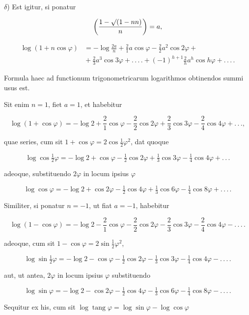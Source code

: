 $\delta$) Est igitur, si ponatur

\[
\left(\frac{1-\mathord{\surd}(1-nn)}{n}\right) = a,
\]

\[
\begin{aligned}
\log(1+n\cos\varphi) & = -\log\frac{2a}{n} + \frac{2}{1}a\cos\varphi - \frac{2}{2}a^2\cos2\varphi +\\
&{} + \frac{2}{3}a^3\cos3\varphi + .\,.\,.\,. + (-1)^{h+1}\frac{2}{h}a^h\cos h\varphi + .\,.\,.\,.
\end{aligned}
\]

 Formula haec ad functionum trigonometricarum logarithmos obtinendos summi
usus est.

Sit enim $n=1$, fiet $a=1$, et habebitur

\[
\log(1+\cos\varphi) = -\log 2 + \frac{2}{1}\cos\varphi - \frac{2}{2}\cos2\varphi + \frac{2}{3}\cos3\varphi - \frac{2}{4}\cos4\varphi + .\,.\,.,
\]

\noindent quae series, cum sit $1+\cos\varphi = 2\cos\frac{1}{2}\varphi^2$, 
dat quoque

\[
\log\cos\tfrac{1}{2}\varphi = -\log 2 + \cos\varphi - \tfrac{1}{2}\cos2\varphi + \tfrac{1}{3}\cos3\varphi - \tfrac{1}{4}\cos4\varphi + .\,.\,.
\]

\noindent adeoque, substituendo $2\varphi$ in locum ipsius $\varphi$

\[
\log\cos\varphi = -\log 2 + \cos2\varphi - \tfrac{1}{2}\cos4\varphi + \tfrac{1}{3}\cos6\varphi - \tfrac{1}{4}\cos8\varphi + .\,.\,.\,.
\]

\noindent Similiter, si ponatur $n=-1$, ut fiat $a=-1$, habebitur

\[
\log(1-\cos\varphi) = -\log 2 - \frac{2}{1}\cos\varphi - \frac{2}{2}\cos2\varphi - \frac{2}{3}\cos3\varphi - \frac{2}{4}\cos4\varphi - .\,.\,.\,.
\]

\noindent adeoque, cum sit $1-\cos\varphi = 2\sin\tfrac{1}{2}\varphi^2$, 

\[
\log\sin\tfrac{1}{2}\varphi = -\log 2 - \cos\varphi - \tfrac{1}{2}\cos2\varphi - \tfrac{1}{3}\cos3\varphi - \tfrac{1}{4}\cos4\varphi - .\,.\,.\,.
\]

\noindent aut, ut antea, $2\varphi$ in locum ipsius $\varphi$ substituendo

\[
\log\sin\varphi = -\log 2 - \cos2\varphi - \tfrac{1}{2}\cos4\varphi - \tfrac{1}{3}\cos6\varphi - \tfrac{1}{4}\cos8\varphi - .\,.\,.\,.
\]

\noindent Sequitur ex his, cum sit $\log\operatorname{tang}\varphi = \log\sin\varphi - \log\cos\varphi$

